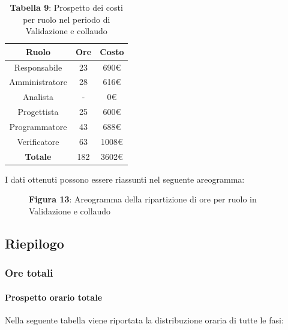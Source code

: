 \begin{table}[H]
	\centering
	\renewcommand{\arraystretch}{1.5}
	\begin{tabular}{|c|c|c|}
		\hline
		\rowcolor{lighter-grayer}
Ruolo & Ore & Costo \\ \hline
Responsabile & 23 & 690\euro \\ \hline
Amministratore & 28 & 616\euro \\ \hline
Analista & - & 0\euro \\ \hline
Progettista & 25 & 600\euro \\ \hline
Programmatore & 43 & 688\euro \\ \hline
Verificatore & 63 & 1008\euro \\ \hline
\textbf{Totale} & 182 & 3602\euro \\ \hline
	\end{tabular}
\caption*{\textbf{Tabella 9}: Prospetto dei costi per ruolo nel periodo di Validazione e collaudo\\}
\end{table}

I dati ottenuti possono essere riassunti nel seguente areogramma:


\begin{figure}[H]
	\centering
	\caption*{\textbf{Figura 13}: Areogramma della ripartizione di ore per ruolo in Validazione e collaudo}
	\label{fig:Figura10}
\end{figure}

\subsection{Riepilogo}
\subsubsection{Ore totali}
\paragraph{Prospetto orario totale}
Nella seguente tabella viene riportata la distribuzione oraria di tutte le fasi:

